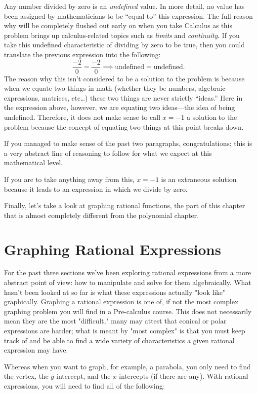 \documentclass[../book.tex]{subfiles}
\begin{document}
Any number divided by zero is an \textit{undefined} value. In more detail, no value has been assigned by mathematicians to be “equal to” this expression. The full reason why will be completely flushed out early on when you take Calculus as this problem brings up calculus-related topics such as \textit{limits} and \textit{continuity}. If you take this undefined characteristic of dividing by zero to be true, then you could translate the previous expression into the following: $$\dfrac{-2}{0}=\dfrac{-2}{0} \implies \text{undefined}=\text{undefined}.$$
The reason why this isn't considered to be a solution to the problem is because when we equate two things in math (whether they be numbers, algebraic expressions, matrices, etc…) these two things are never strictly “ideas.” Here in the expression above, however, we are equating two ideas—the idea of being undefined. Therefore, it does not make sense to call $x=-1$ a solution to the problem because the concept of equating two things at this point breaks down.

If you managed to make sense of the past two paragraphs, congratulations; this is a very abstract line of reasoning to follow for what we expect at this mathematical level. 
\begin{note}
If you are to take anything away from this, $x=-1$ is an extraneous solution because it leads to an expression in which we divide by zero. 
\end{note}
Finally, let's take a look at graphing rational functions, the part of this chapter that is almost completely different from the polynomial chapter.
\section{Graphing Rational Expressions}
\noindent For the past three sections we've been exploring rational expressions from a more abstract point of view: how to manipulate and solve for them algebraically. What hasn't been looked at so far is what these expressions actually "look like" graphically. Graphing a rational expression is one of, if not the most complex graphing problem you will find in a Pre-calculus course. This does not necessarily mean they are the most "difficult," many may attest that conical or polar expressions are harder; what is meant by "most complex" is that you must keep track of and be able to find a wide variety of characteristics a given rational expression may have.

Whereas when you want to graph, for example, a parabola, you only need to find the vertex, the $y$-intercept, and the $x$-intercepts (if there are any). With rational expressions, you will need to find all of the following: 
\end{document}
